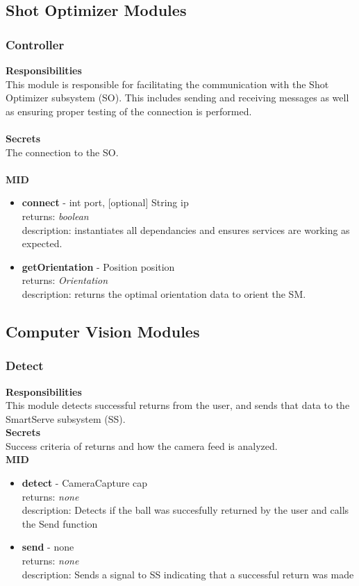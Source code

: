 \documentclass[11pt]{article}
\begin{document}
\subsection{Shot Optimizer Modules}
\subsubsection*{Controller}
\textbf{Responsibilities} \\
This module is responsible for facilitating the communication with the Shot Optimizer subsystem (SO). This includes sending and receiving messages as well as ensuring proper testing of the connection is performed. \\ \\
\textbf{Secrets} \\ 
The connection to the SO. \\ \\
\textbf{MID} 
\begin{itemize}
\item \textbf{connect} - int  port, [optional] String ip \\ returns: \textit{boolean} \\ description: instantiates all dependancies and ensures services are working as expected.
\item \textbf{getOrientation} - Position  position \\ returns: \textit{Orientation} \\ description: returns the optimal orientation data to orient the SM.
\end{itemize}

\subsection{Computer Vision Modules}
\subsubsection*{Detect}
\textbf{Responsibilities} \\
This module detects successful returns from the user, and sends that data to the SmartServe subsystem (SS).\\
\textbf{Secrets} \\ 
Success criteria of returns and how the camera feed is analyzed.\\ 
\textbf{MID} 
\begin{itemize}
\item \textbf{detect} - CameraCapture cap \\ returns: \textit{none} \\ description: Detects if the ball was succesfully returned by the user and calls the Send function
\item \textbf{send} - none \\ returns: \textit{none} \\ description: Sends a signal to SS indicating that a successful return was made
\end{itemize}
\end{document}
